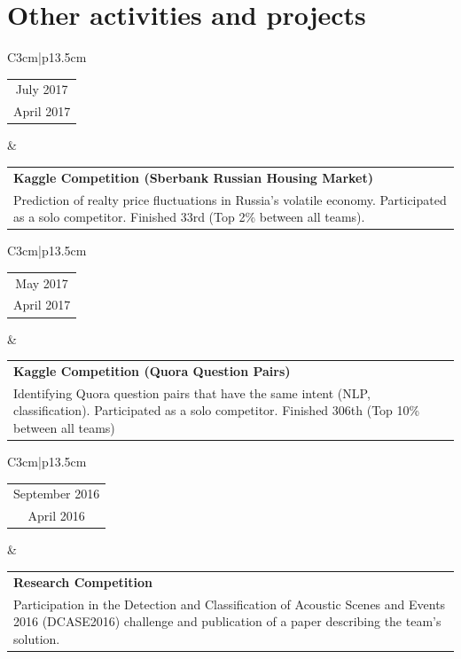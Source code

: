 \section{Other activities and projects}

\begin{tabular}{C{3cm}|p{13.5cm}}
    \begin{tabular}{c}
        July 2017
        \\
        April 2017
    \end{tabular}
    &
    \setlength\extrarowheight{3pt}
    \begin{tabular}{p{13.5cm}}
        \textbf{Kaggle Competition (Sberbank Russian Housing Market)}
        \\
        Prediction of realty price fluctuations in Russia’s volatile economy. Participated as a solo competitor. Finished 33rd (Top 2\% between all teams).
    \end{tabular}
\end{tabular}


\begin{tabular}{C{3cm}|p{13.5cm}}
    \begin{tabular}{c}
        May 2017
        \\
        April 2017
    \end{tabular}
    &
    \setlength\extrarowheight{3pt}
    \begin{tabular}{p{13.5cm}}
        \textbf{Kaggle Competition (Quora Question Pairs)}
        \\
        Identifying Quora question pairs that have the same intent (NLP, classification). Participated as a solo competitor. Finished 306th (Top 10\% between all teams)
    \end{tabular}
\end{tabular}


\begin{tabular}{C{3cm}|p{13.5cm}}
    \begin{tabular}{c}
        September 2016
        \\
        April 2016
    \end{tabular}
    &
    \setlength\extrarowheight{3pt}
    \begin{tabular}{p{13.5cm}}
        \textbf{Research Competition}
        \\
        Participation in the Detection and Classification of Acoustic Scenes and Events 2016 (DCASE2016) challenge and publication of a paper describing the team's solution.
    \end{tabular}
\end{tabular}


